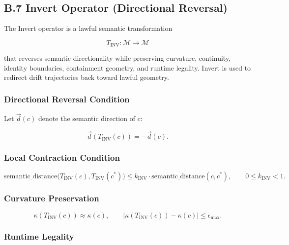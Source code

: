 
\subsection*{B.7 Invert Operator (Directional Reversal)}

\noindent The Invert operator is a lawful semantic transformation



\[
T_{\mathrm{INV}} : \mathcal{M} \rightarrow \mathcal{M}
\]



that reverses semantic directionality while preserving curvature, continuity,
identity boundaries, containment geometry, and runtime legality. Invert is used
to redirect drift trajectories back toward lawful geometry.

\subsubsection*{Directional Reversal Condition}

Let $\vec{d}(c)$ denote the semantic direction of $c$:



\[
\vec{d}(T_{\mathrm{INV}}(c)) = -\vec{d}(c).
\]



\subsubsection*{Local Contraction Condition}



\[
\text{semantic\_distance}\big(T_{\mathrm{INV}}(c), T_{\mathrm{INV}}(c^*)\big)
\le k_{\mathrm{INV}} \cdot \text{semantic\_distance}(c, c^*),
\qquad 0 \le k_{\mathrm{INV}} < 1.
\]



\subsubsection*{Curvature Preservation}



\[
\kappa(T_{\mathrm{INV}}(c)) \approx \kappa(c),
\qquad
|\kappa(T_{\mathrm{INV}}(c)) - \kappa(c)| \le \epsilon_{\max}.
\]



\subsubsection*{Runtime Legality}

